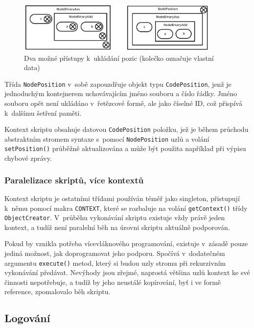 \documentclass[11pt,twoside,a4paper]{book}
\begin{document}
\begin{figure}[ht]
\begin{center}
\includegraphics[width=10cm]{img/nodeposition.pdf}
\caption[Dva možné přístupy k~ukládání pozic]{Dva možné přístupy k~ukládání pozic (kolečko označuje vlastní data)}
\label{fig:nodeposition}
\end{center}
\end{figure}

Třída \texttt{NodePosition} v~sobě zapouzdřuje objekt typu \texttt{CodePosition}, jenž je jednoduchým kontejnerem uchovávajícím jméno souboru a číslo řádky. Jméno souboru opět není ukládáno v~řetězcové formě, ale jako číselné ID, což přispívá k~dalšímu šetření paměti.

Kontext skriptu obsahuje datovou \texttt{CodePosition} položku, jež je během průchodu abs\-trakt\-ním stromem syntaxe s~pomocí \texttt{NodePosition} uzlů a volání \texttt{setPosition()} průběžně aktualizována a může být použita například při výpisu chybové zprávy.


\subsubsection{Paralelizace skriptů, více kontextů}

Kontext skriptu je ostatními třídami používán téměř jako singleton, přistupují k~němu pomocí makra \texttt{CONTEXT}, které se rozbaluje na volání \texttt{getContext()} třídy \texttt{ObjectCreator}. V~průběhu vykonávání skriptu existuje vždy právě jeden kontext, a tudíž není paralelní běh na úrovni skriptu aktuálně podporován.

Pokud by vznikla potřeba vícevláknového programování, existuje v~zásadě pouze jediná mož\-nost, jak doprogramovat jeho podporu. Spočívá v~dodatečném argumentu \texttt{execute()} metod, který si budou uzly stromu při rekurzivním vykonávání předávat. Nevýhody jsou zřejmé, naprostá většina uzlů kontext ke své činnosti nepotřebuje, a tudíž by jeho neustálé kopírování, byť i ve formě reference, zpomalovalo běh skriptu.


\subsection{Logování}
\end{document}

